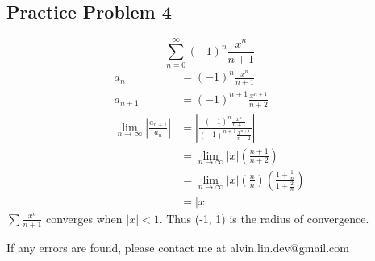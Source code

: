 \documentclass[letterpaper, 12pt]{article}
\begin{document}
\subsection*{Practice Problem 4}
\[ \sum_{n=0}^{\infty}(-1)^{n}\frac{x^{n}}{n+1} \]
\begin{align*}
  a_{n} &= (-1)^{n}\frac{x^{n}}{n+1} \\
  a_{n+1} &= (-1)^{n+1}\frac{x^{n+1}}{n+2} \\
  \lim_{n\to\infty}|\frac{a_{n+1}}{a_{n}}| &=
    |\frac{(-1)^{n}\frac{x^{n}}{n+1}}{(-1)^{n+1}\frac{x^{n+1}}{n+2}}| \\
  &= \lim_{n\to\infty}|x|(\frac{n+1}{n+2}) \\
  &= \lim_{n\to\infty}|x|(\frac{n}{n})(\frac{1+\frac{1}{n}}{1+\frac{2}{n}}) \\
  &= |x|
\end{align*}
\( \sum\frac{x^{n}}{n+1} \) converges when \( |x| < 1 \). Thus (-1, 1)
is the radius of convergence.

\begin{center}
  If any errors are found, please contact me at alvin.lin.dev@gmail.com
\end{center}
\end{document}
